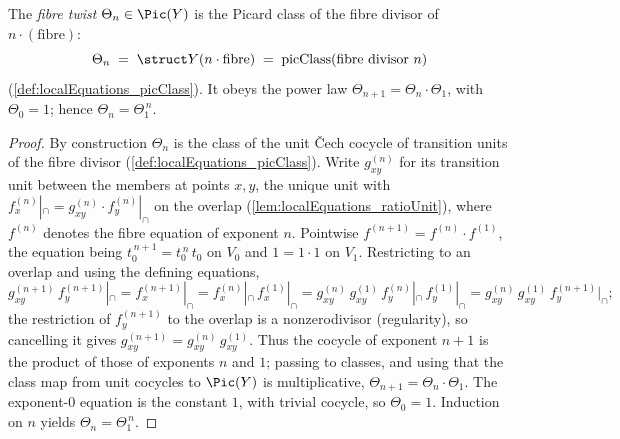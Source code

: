 \begin{definition}
  \label{def:fiberTwist}
  \leanok
  The \emph{fibre twist} \(\Theta_n \in \Pic(Y)\) is the Picard class of the fibre divisor of
  \(n\cdot(\text{fibre})\):
  \[
    \Theta_n \;=\; \struct Y(n\cdot\text{fibre}) \;=\; \mathrm{picClass}(\text{fibre divisor } n)
  \]
  (\ref{def:localEquations_picClass}). It obeys the power law \(\Theta_{n+1} = \Theta_n \cdot
  \Theta_1\), with \(\Theta_0 = 1\); hence \(\Theta_n = \Theta_1^{\,n}\).
\end{definition}
\begin{proof}
  \leanok
  By construction \(\Theta_n\) is the class of the unit \v Cech cocycle of transition units of the
  fibre divisor (\ref{def:localEquations_picClass}). Write \(g^{(n)}_{xy}\) for its transition unit
  between the members at points \(x, y\), the unique unit with \(f^{(n)}_x|_{\cap} = g^{(n)}_{xy}
  \cdot f^{(n)}_y|_{\cap}\) on the overlap (\ref{lem:localEquations_ratioUnit}), where \(f^{(n)}\)
  denotes the fibre equation of exponent \(n\). Pointwise \(f^{(n+1)} = f^{(n)} \cdot f^{(1)}\), the
  equation being \(t_0^{\,n+1} = t_0^{\,n}\,t_0\) on \(V_0\) and \(1 = 1\cdot 1\) on \(V_1\).
  Restricting to an overlap and using the defining equations,
  \[
    g^{(n+1)}_{xy}\, f^{(n+1)}_y|_{\cap}
      = f^{(n+1)}_x|_{\cap}
      = f^{(n)}_x|_{\cap}\, f^{(1)}_x|_{\cap}
      = g^{(n)}_{xy}\, g^{(1)}_{xy}\, f^{(n)}_y|_{\cap}\, f^{(1)}_y|_{\cap}
      = g^{(n)}_{xy}\, g^{(1)}_{xy}\, f^{(n+1)}_y|_{\cap};
  \]
  the restriction of \(f^{(n+1)}_y\) to the overlap is a nonzerodivisor (regularity), so cancelling
  it gives \(g^{(n+1)}_{xy} = g^{(n)}_{xy}\, g^{(1)}_{xy}\). Thus the cocycle of exponent \(n+1\) is
  the product of those of exponents \(n\) and \(1\); passing to classes, and using that the class map
  from unit cocycles to \(\Pic(Y)\) is multiplicative, \(\Theta_{n+1} = \Theta_n \cdot \Theta_1\).
  The exponent-\(0\) equation is the constant \(1\), with trivial cocycle, so \(\Theta_0 = 1\).
  Induction on \(n\) yields \(\Theta_n = \Theta_1^{\,n}\).
\end{proof}

